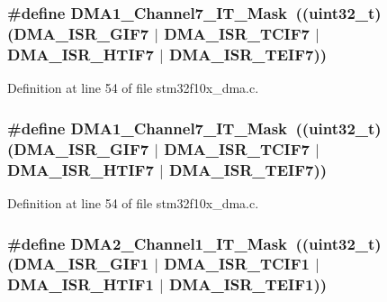 \subsubsection[{\texorpdfstring{D\+M\+A1\+\_\+\+Channel7\+\_\+\+I\+T\+\_\+\+Mask}{DMA1_Channel7_IT_Mask}}]{\setlength{\rightskip}{0pt plus 5cm}\#define D\+M\+A1\+\_\+\+Channel7\+\_\+\+I\+T\+\_\+\+Mask~(({\bf uint32\+\_\+t})({\bf D\+M\+A\+\_\+\+I\+S\+R\+\_\+\+G\+I\+F7} $\vert$ {\bf D\+M\+A\+\_\+\+I\+S\+R\+\_\+\+T\+C\+I\+F7} $\vert$ {\bf D\+M\+A\+\_\+\+I\+S\+R\+\_\+\+H\+T\+I\+F7} $\vert$ {\bf D\+M\+A\+\_\+\+I\+S\+R\+\_\+\+T\+E\+I\+F7}))}\hypertarget{group___d_m_a___private___defines_ga510bb442153092ff35e73dcaa845d8d1}{}\label{group___d_m_a___private___defines_ga510bb442153092ff35e73dcaa845d8d1}


Definition at line 54 of file stm32f10x\+\_\+dma.\+c.

\subsubsection[{\texorpdfstring{D\+M\+A1\+\_\+\+Channel7\+\_\+\+I\+T\+\_\+\+Mask}{DMA1_Channel7_IT_Mask}}]{\setlength{\rightskip}{0pt plus 5cm}\#define D\+M\+A1\+\_\+\+Channel7\+\_\+\+I\+T\+\_\+\+Mask~(({\bf uint32\+\_\+t})({\bf D\+M\+A\+\_\+\+I\+S\+R\+\_\+\+G\+I\+F7} $\vert$ {\bf D\+M\+A\+\_\+\+I\+S\+R\+\_\+\+T\+C\+I\+F7} $\vert$ {\bf D\+M\+A\+\_\+\+I\+S\+R\+\_\+\+H\+T\+I\+F7} $\vert$ {\bf D\+M\+A\+\_\+\+I\+S\+R\+\_\+\+T\+E\+I\+F7}))}\hypertarget{group___d_m_a___private___defines_ga510bb442153092ff35e73dcaa845d8d1}{}\label{group___d_m_a___private___defines_ga510bb442153092ff35e73dcaa845d8d1}


Definition at line 54 of file stm32f10x\+\_\+dma.\+c.

\subsubsection[{\texorpdfstring{D\+M\+A2\+\_\+\+Channel1\+\_\+\+I\+T\+\_\+\+Mask}{DMA2_Channel1_IT_Mask}}]{\setlength{\rightskip}{0pt plus 5cm}\#define D\+M\+A2\+\_\+\+Channel1\+\_\+\+I\+T\+\_\+\+Mask~(({\bf uint32\+\_\+t})({\bf D\+M\+A\+\_\+\+I\+S\+R\+\_\+\+G\+I\+F1} $\vert$ {\bf D\+M\+A\+\_\+\+I\+S\+R\+\_\+\+T\+C\+I\+F1} $\vert$ {\bf D\+M\+A\+\_\+\+I\+S\+R\+\_\+\+H\+T\+I\+F1} $\vert$ {\bf D\+M\+A\+\_\+\+I\+S\+R\+\_\+\+T\+E\+I\+F1}))}\hypertarget{group___d_m_a___private___defines_ga1a8a861830805d87d8f487920525125d}{}\label{group___d_m_a___private___defines_ga1a8a861830805d87d8f487920525125d}


